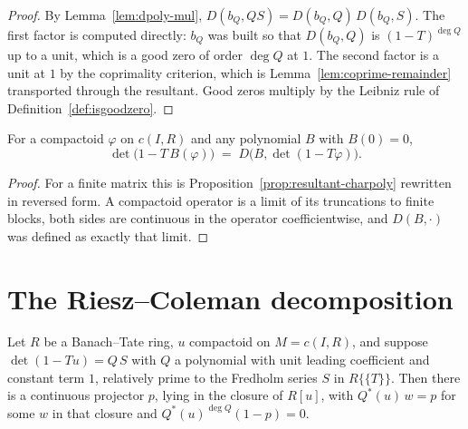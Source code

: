 \begin{proof}
  \leanok
  By Lemma~\ref{lem:dpoly-mul}, $D(b_Q, QS) = D(b_Q, Q)\,D(b_Q, S)$.  The first factor is
  computed directly: $b_Q$ was built so that $D(b_Q, Q)$ is $(1-T)^{\deg Q}$ up to a unit, which
  is a good zero of order $\deg Q$ at $1$.  The second factor is a unit at $1$ by the
  coprimality criterion, which is Lemma~\ref{lem:coprime-remainder} transported through the
  resultant.  Good zeros multiply by the Leibniz rule of Definition~\ref{def:isgoodzero}.
\end{proof}

\begin{theorem}
  \label{thm:spectral-mapping}
  \leanok
  For a compactoid $\varphi$ on $c(I,R)$ and any polynomial $B$ with $B(0)=0$,
  \[
    \det\bigl(1 - T\,B(\varphi)\bigr) \;=\; D\bigl(B, \det(1-T\varphi)\bigr).
  \]
\end{theorem}

\begin{proof}
  \leanok
  For a finite matrix this is Proposition~\ref{prop:resultant-charpoly} rewritten in reversed
  form.  A compactoid operator is a limit of its truncations to finite blocks, both sides are
  continuous in the operator coefficientwise, and $D(B,\cdot)$ was defined as exactly that
  limit.
\end{proof}

\section{The Riesz--Coleman decomposition}

\begin{theorem}
  \label{thm:riesz-coleman}
  \leanok
  Let $R$ be a Banach--Tate ring, $u$ compactoid on $M = c(I,R)$, and suppose
  $\det(1-Tu) = Q\,S$ with $Q$ a polynomial with unit leading coefficient and constant term $1$,
  relatively prime to the Fredholm series $S$ in $R\{\{T\}\}$.  Then there is a continuous
  projector $p$, lying in the closure of $R[u]$, with $Q^{*}(u)\,w = p$ for some $w$ in that
  closure and $Q^{*}(u)^{\deg Q}(1-p) = 0$.
\end{theorem}

